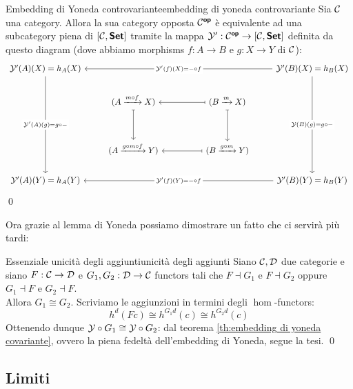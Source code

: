 \documentclass{article}
\renewcommand\C{\mc{C}}
\newcommand\D{\mc{D}}
\begin{document}
\begin{corollary}{Embedding di Yoneda controvariante}{embedding di yoneda controvariante}
    Sia $\C$ una category. Allora la sua category opposta $\C^\op$ è equivalente ad una subcategory piena di $[\C, \setcat]$ tramite la mappa $\mc{Y}' : \C^\op \to [\C, \setcat]$ definita da questo diagram (dove abbiamo morphisms $f:A\to B$ e $g:X\to Y$ di $\C$):
    \[\begin{tikzcd}
    	{\mc{Y}'(A)(X) = h_A(X)} &&&& {\mc{Y}'(B)(X) = h_B(X)} \\
    	& {(A \xrightarrow{m\circ f} X)} && {(B \xrightarrow{m} X)} \\
    	\\
    	& {(A \xrightarrow{g\circ m\circ f} Y)} && {(B \xrightarrow{g\circ m} Y)} \\
    	{\mc{Y}'(A)(Y) = h_A(Y)} &&&& {\mc{Y}'(B)(Y) = h_B(Y)}
    	\arrow["{\mc{Y}'(A)(g) = g\circ -}"{description}, from=1-1, to=5-1]
    	\arrow["{\mc{Y}'(f)(X) = -\circ f}"{description}, from=1-5, to=1-1]
    	\arrow["{\mc{Y}(B)(g) = g\circ -}"{description}, from=1-5, to=5-5]
    	\arrow[maps to, from=2-2, to=4-2]
    	\arrow[maps to, from=2-4, to=2-2]
    	\arrow[maps to, from=2-4, to=4-4]
	    \arrow[maps to, from=4-4, to=4-2]
	    \arrow["{\mc{Y}'(f)(Y) = -\circ f}"{description}, from=5-5, to=5-1]
    \end{tikzcd}\]
    \qed
\end{corollary}

Ora grazie al lemma di Yoneda possiamo dimostrare un fatto che ci servirà più tardi:

\begin{lemma}{Essenziale unicità degli aggiunti}{unicità degli aggiunti}
    Siano $\C,\D$ due categorie e siano $F:\C\to\D$ e $G_1,G_2: \D\to\C$ functors tali che $F\dashv G_1$ e $F\dashv G_2$ oppure $G_1\dashv F$ e $G_2\dashv F$.\\
    Allora $G_1\cong G_2$.
    \proof 
    Scriviamo le aggiunzioni in termini degli $\hom$-functors:
    \[ h^d(Fc) \cong h^{G_1 d}(c) \cong h^{G_2 d}(c) \]
    Ottenendo dunque $\mathcal{Y}\circ G_1 \cong \mathcal{Y}\circ G_2$: dal teorema \ref{th:embedding di yoneda covariante}, ovvero la piena fedeltà dell'embedding di Yoneda, segue la tesi.
    \qed
\end{lemma}

\subsection{Limiti}
\end{document}
